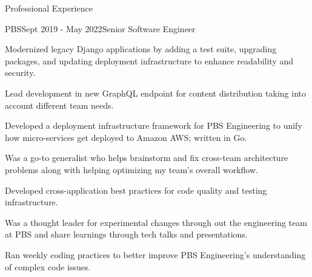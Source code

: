 \documentclass{bluefin_cv}
\begin{document}
\begin{bfcvSection}{Professional Experience}
\begin{bfcvWorkSubsection}{PBS}{Sept 2019 - May 2022}{Senior Software Engineer}
\item Modernized legacy Django applications by adding a test suite, upgrading packages, and updating deployment infrastructure to enhance readability and security.
\item Lead development in new GraphQL endpoint for content distribution taking into account different team needs.
\item Developed a deployment infrastructure framework for PBS Engineering to unify how micro-services get deployed to Amazon AWS; written in Go.
\item Was a go-to generalist who helps brainstorm and fix cross-team architecture problems along with helping optimizing my team's overall workflow.
\item Developed cross-application best practices for code quality and testing infrastructure.
\item Was a thought leader for experimental changes through out the engineering team at PBS and share learnings through tech talks and presentations.
\item Ran weekly coding practices to better improve PBS Engineering's understanding of complex code issues.
\end{bfcvWorkSubsection}

\end{bfcvSection}
\clearpage
\end{document}
